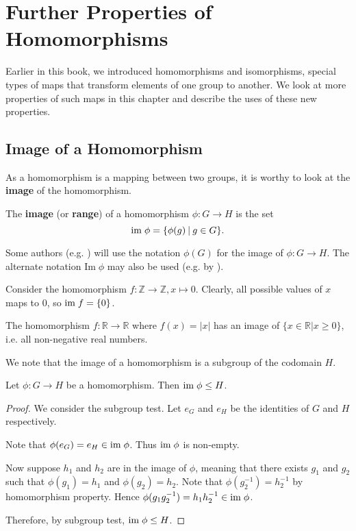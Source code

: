 \chapter{Further Properties of Homomorphisms}
Earlier in this book, we introduced homomorphisms and isomorphisms, special types of maps that transform elements of one group to another. We look at more properties of such maps in this chapter and describe the uses of these new properties.

\section{Image of a Homomorphism}
As a homomorphism is a mapping between two groups, it is worthy to look at the \textbf{image} of the homomorphism.
\begin{definition}
    The \textbf{image} (or \textbf{range}) of a homomorphism $\phi: G \to H$ is the set
    \[
        \im\phi = \{\phi(g) \vert g \in G\}.
    \]
\end{definition}
\begin{remark}
    Some authors (e.g. \cite{libretexts_im-and-ker}) will use the notation $\phi(G)$ for the image of $\phi: G \to H$. The alternate notation $\mathrm{Im}\;\phi$ may also be used (e.g. by \cite{clark_1984, hungerford_1980}).
\end{remark}

\begin{example}
    Consider the homomorphism $f: \mathbb{Z} \to \mathbb{Z}, x \mapsto 0$. Clearly, all possible values of $x$ maps to 0, so $\mathrm{im}\; f = \{0\}$.
\end{example}
\begin{example}
    The homomorphism $f: \mathbb{R} \to \mathbb{R}$ where $f(x) = |x|$ has an image of $\{x \in \mathbb{R} \vert x \geq 0\}$, i.e. all non-negative real numbers.
\end{example}

\newpage

We note that the image of a homomorphism is a subgroup of the codomain $H$.
\begin{proposition}\label{prop-image-is-subgroup-of-codomain}
    Let $\phi: G \to H$ be a homomorphism. Then $\mathrm{im}\;\phi \leq H$.
\end{proposition}
\begin{proof}
    We consider the subgroup test. Let $e_G$ and $e_H$ be the identities of $G$ and $H$ respectively.
    
    Note that $\phi(e_G) = e_H \in \mathrm{im}\;\phi$. Thus $\mathrm{im}\;\phi$ is non-empty.
    
    Now suppose $h_1$ and $h_2$ are in the image of $\phi$, meaning that there exists $g_1$ and $g_2$ such that $\phi(g_1) = h_1$ and $\phi(g_2) = h_2$. Note that $\phi(g_2^{-1}) = h_2^{-1}$ by homomorphism property. Hence $\phi(g_1g_2^{-1}) = h_1h_2^{-1} \in \mathrm{im}\;\phi$.

    Therefore, by subgroup test, $\mathrm{im}\;\phi \leq H$.
\end{proof}


